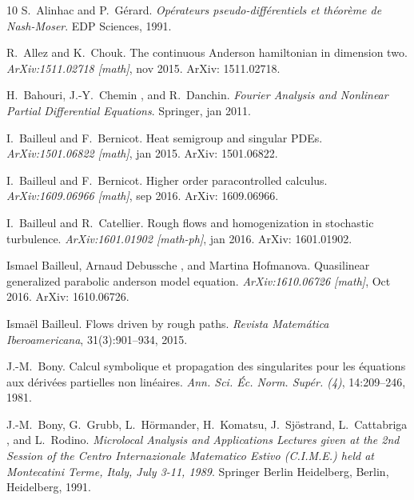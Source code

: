 \documentclass{amsart}
\newcommand{\tmtextit}[1]{{\itshape{#1}}}
\theoremstyle{remark}
\theoremstyle{definition}
\begin{document}
\begin{thebibliography}{10}
  S.~Alinhac  and 
  P.~G{\'e}rard.{\newblock} \tmtextit{Op{\'e}rateurs pseudo-diff{\'e}rentiels
  et th{\'e}or{\`e}me de Nash-Moser}.{\newblock} EDP Sciences,
  1991.{\newblock}
  
  R.~Allez  and  K.~Chouk.{\newblock} The
  continuous Anderson hamiltonian in dimension two.{\newblock}
  \tmtextit{ArXiv:1511.02718 [math]}, nov 2015.{\newblock} ArXiv:
  1511.02718.{\newblock}
  
  H.~Bahouri, J.-Y.~Chemin , and 
  R.~Danchin.{\newblock} \tmtextit{Fourier Analysis and Nonlinear Partial
  Differential Equations}.{\newblock} Springer, jan 2011.{\newblock}
  
  I.~Bailleul  and  F.~Bernicot.{\newblock}
  Heat semigroup and singular PDEs.{\newblock} \tmtextit{ArXiv:1501.06822
  [math]}, jan 2015.{\newblock} ArXiv: 1501.06822.{\newblock}
  
  I.~Bailleul  and  F.~Bernicot.{\newblock}
  Higher order paracontrolled calculus.{\newblock} \tmtextit{ArXiv:1609.06966
  [math]}, sep 2016.{\newblock} ArXiv: 1609.06966.{\newblock}
  
  I.~Bailleul  and  R.~Catellier.{\newblock}
  Rough flows and homogenization in stochastic turbulence.{\newblock}
  \tmtextit{ArXiv:1601.01902 [math-ph]}, jan 2016.{\newblock} ArXiv:
  1601.01902.{\newblock}
  
  Ismael Bailleul, Arnaud Debussche , and  Martina
  Hofmanova.{\newblock} Quasilinear generalized parabolic anderson model
  equation.{\newblock} \tmtextit{ArXiv:1610.06726 [math]}, Oct
  2016.{\newblock} ArXiv: 1610.06726.{\newblock}
  
  Isma{\"e}l Bailleul.{\newblock} Flows driven
  by rough paths.{\newblock} \tmtextit{Revista Matem{\'a}tica Iberoamericana},
  31(3):901--934, 2015.{\newblock}
  
  J.-M.~Bony.{\newblock} Calcul symbolique et propagation
  des singularites pour les {\'e}quations aux d{\'e}riv{\'e}es partielles non
  lin{\'e}aires.{\newblock} \tmtextit{Ann. Sci. {\'E}c. Norm. Sup{\'e}r. (4)},
  14:209--246, 1981.{\newblock}
  
  J.-M.~Bony, G.~Grubb, L.~H{\"o}rmander,
  H.~Komatsu, J.~Sj{\"o}strand, L.~Cattabriga , and  L.~Rodino.{\newblock}
  \tmtextit{Microlocal Analysis and Applications Lectures given at the 2nd
  Session of the Centro Internazionale Matematico Estivo (C.I.M.E.) held at
  Montecatini Terme, Italy, July 3-11, 1989}.{\newblock} Springer Berlin
  Heidelberg, Berlin, Heidelberg, 1991.{\newblock}
  

\end{thebibliography}
\end{document}
